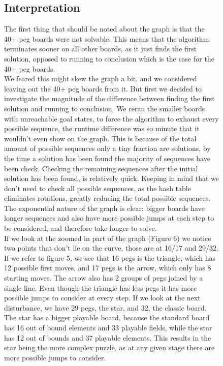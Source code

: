 \documentclass[11pt]{article}
\begin{document}
\begin{figure}
\subsection{Interpretation}
The first thing that should be noted about the graph is that the 40+ peg boards were not solvable. This means that the algorithm terminates sooner on all other boards, as it just finds the first solution, opposed to running to conclusion which is the case for the 40+ peg boards.\\
We feared this might skew the graph a bit, and we considered leaving out the 40+ peg boards from it. But first we decided to investigate the magnitude of the difference between finding the first solution and running to conclusion. We reran the smaller boards with unreachable goal states, to force the algorithm to exhaust every possible sequence, the runtime difference was so minute that it wouldn't even show on the graph. This is because of the total amount of possible sequences only a tiny fraction are solutions, by the time a solution has been found the majority of sequences have been check. Checking the remaining sequences after the initial solution has been found, is relatively quick. Keeping in mind that we don't need to check all possible sequences, as the hash table eliminates rotations, greatly reducing the total possible sequences.\\
The exponential nature of the graph is clear: bigger boards have longer sequences and also have more possible jumps at each step to be considered, and therefore take longer to solve.\\
If we look at the zoomed in part of the graph (Figure 6) we notice two points that don't lie on the curve, those are at 16/17 and 29/32.\\
If we refer to figure 5, we see that 16 pegs is the triangle, which has 12 possible first moves, and 17 pegs is the arrow, which only has 8 starting moves. The arrow also has 2 groups of pegs joined by a single line. Even though the triangle has less pegs it has more possible jumps to consider at every step.\newline
If we look at the next disturbance, we have 29 pegs, the star, and 32, the classic board. The star has a bigger playable board, because the standard board has 16 out of bound elements and 33 playable fields, while the star has 12 out of bounds and 37 playable elements. This results in the star being the more complex puzzle, as at any given stage there are more possible jumps to consider.\\
\end{figure}
\end{document}
